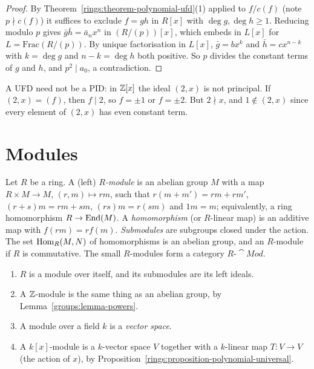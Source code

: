 \begin{proof}
By Theorem~\ref{rings:theorem-polynomial-ufd}(1) applied to $f/c(f)$ (note $p \nmid c(f)$) it
suffices to exclude $f = gh$ in $R[x]$ with $\deg g, \deg h \geq 1$. Reducing modulo $p$
gives $\bar g \bar h = \bar a_n x^n$ in $(R/(p))[x]$, which embeds in $L[x]$ for
$L = \mathrm{Frac}(R/(p))$. By unique factorisation in $L[x]$, $\bar g = bx^k$ and
$\bar h = cx^{n-k}$ with $k = \deg g$ and $n - k = \deg h$ both positive. So $p$ divides the
constant terms of $g$ and $h$, and $p^2 \mid a_0$, a contradiction.
\end{proof}

\begin{counterexample}\label{rings:counterexample-ufd-not-pid}
A UFD need not be a PID: in $\mathbb{Z}[x]$ the ideal $(2, x)$ is not principal. If
$(2, x) = (f)$, then $f \mid 2$, so $f = \pm 1$ or $f = \pm 2$. But $2 \nmid x$, and
$1 \notin (2, x)$ since every element of $(2, x)$ has even constant term.
\end{counterexample}

\section{Modules}\label{rings:section-modules}

\begin{definition}\label{rings:definition-module}
Let $R$ be a ring. A (left) \emph{$R$-module} is an abelian group $M$ with a map
$R \times M \to M$, $(r, m) \mapsto rm$, such that $r(m + m') = rm + rm'$,
$(r + s)m = rm + sm$, $(rs)m = r(sm)$ and $1m = m$; equivalently, a ring homomorphism
$R \to \operatorname{End}(M)$. A \emph{homomorphism} (or $R$-linear map) is an additive map with
$f(rm) = rf(m)$. \emph{Submodules} are subgroups closed under the action. The set
$\operatorname{Hom}_R(M, N)$ of homomorphisms is an abelian group, and an $R$-module if $R$ is
commutative. The small $R$-modules form a category $R\text{-}\cat{Mod}$.
\end{definition}

\begin{example}\label{rings:example-modules}
\begin{enumerate}
\item $R$ is a module over itself, and its submodules are its left ideals.
\item A $\mathbb{Z}$-module is the same thing as an abelian group, by Lemma~\ref{groups:lemma-powers}.
\item A module over a field $k$ is a \emph{vector space}.
\item A $k[x]$-module is a $k$-vector space $V$ together with a $k$-linear map
$T \colon V \to V$ (the action of $x$), by Proposition~\ref{rings:proposition-polynomial-universal}.
\end{enumerate}
\end{example}


